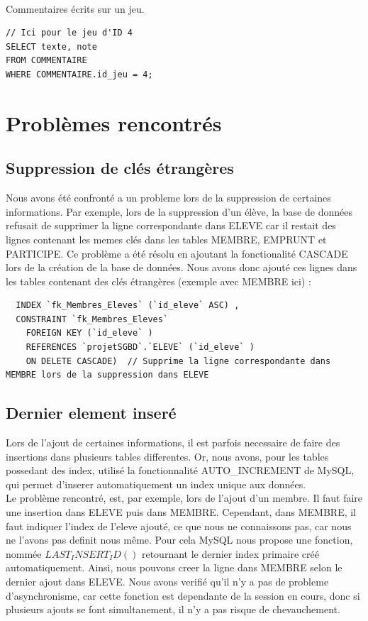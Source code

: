 \documentclass[a4paper, 11pt]{article}
\begin{document}
\paragraph{}
Commentaires écrits sur un jeu.
\begin{verbatim}
// Ici pour le jeu d'ID 4
SELECT texte, note 
FROM COMMENTAIRE
WHERE COMMENTAIRE.id_jeu = 4;
\end{verbatim}
\section{Problèmes rencontrés}
\subsection{Suppression de clés étrangères}
Nous avons été confronté a un probleme lors de la suppression de certaines informations. Par exemple, lors de la suppression d'un élève, la base de données refusait de supprimer la ligne correspondante dans ELEVE car il restait des lignes contenant les memes clés dans les tables MEMBRE, EMPRUNT et PARTICIPE. Ce problème a été résolu en ajoutant la fonctionalité CASCADE lors de la création de la base de données. Nous avons donc ajouté ces lignes dans les tables contenant des clés étrangères (exemple avec MEMBRE ici) :
\begin{verbatim}
  INDEX `fk_Membres_Eleves` (`id_eleve` ASC) ,
  CONSTRAINT `fk_Membres_Eleves`
    FOREIGN KEY (`id_eleve` )
    REFERENCES `projetSGBD`.`ELEVE` (`id_eleve` )
    ON DELETE CASCADE)  // Supprime la ligne correspondante dans MEMBRE lors de la suppression dans ELEVE
\end{verbatim}
\subsection{Dernier element inseré}
Lors de l'ajout de certaines informations, il est parfois necessaire de faire des insertions dans plusieurs tables differentes. Or, nous avons, pour les tables possedant des index, utilisé la fonctionnalité AUTO_INCREMENT de MySQL, qui permet d'inserer automatiquement un index unique aux données. 
\\Le problème rencontré, est, par exemple, lors de l'ajout d'un membre. Il faut faire une insertion dans ELEVE puis dans MEMBRE. Cependant, dans MEMBRE, il faut indiquer l'index de l'eleve ajouté, ce que nous ne connaissons pas, car nous ne l'avons pas definit nous même. Pour cela MySQL nous propose une fonction, nommée $LAST_INSERT_ID()$ retournant le dernier index primaire créé automatiquement. Ainsi, nous pouvons creer la ligne dans MEMBRE selon le dernier ajout dans ELEVE. Nous avons verifié qu'il n'y a pas de probleme d'asynchronisme, car cette fonction est dependante de la session en cours, donc si plusieurs ajouts se font simultanement, il n'y a pas risque de chevauchement.
\end{document}
